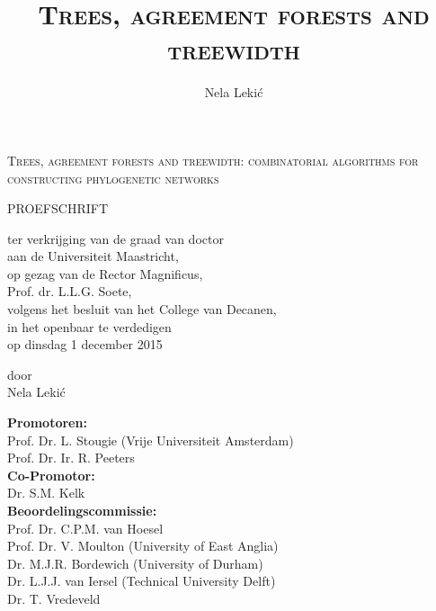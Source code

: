 \documentclass{report}
\author{Nela Leki\'c}
\title{\textsc{\huge Trees, agreement forests and treewidth}} %
\date{}
\begin{document}
\maketitle
\restoregeometry

\newpage
\thispagestyle{empty}
\mbox{}

\newpage


\begin{center}

\vspace{4cm}
{\Large \textsc{Trees, agreement forests and treewidth: combinatorial
algorithms for constructing phylogenetic networks}}

\vspace{3cm}
PROEFSCHRIFT

\vspace{3cm}
ter verkrijging van de graad van doctor \\
aan de Universiteit Maastricht, \\
op gezag van de Rector Magnificus, \\
Prof. dr. L.L.G. Soete, \\
volgens het besluit van het College van Decanen, \\
in het openbaar te verdedigen \\
op dinsdag 1 december 2015



\vspace{3cm}
door \\ 
Nela Leki\'c
\end{center}


\newpage


\noindent \textbf{Promotoren: } \\
\indent Prof. Dr. L. Stougie (Vrije Universiteit Amsterdam)\\
\indent Prof. Dr. Ir. R. Peeters \\

\noindent \textbf{Co-Promotor:} \\
\indent Dr. S.M. Kelk \\

\noindent \textbf{Beoordelingscommissie:} \\
\indent Prof. Dr. C.P.M. van Hoesel \\
\indent Prof. Dr. V. Moulton (University of East Anglia)\\
\indent Dr. M.J.R. Bordewich (University of Durham) \\
\indent Dr. L.J.J. van Iersel (Technical University Delft) \\
\indent Dr. T. Vredeveld \\
\end{document}
